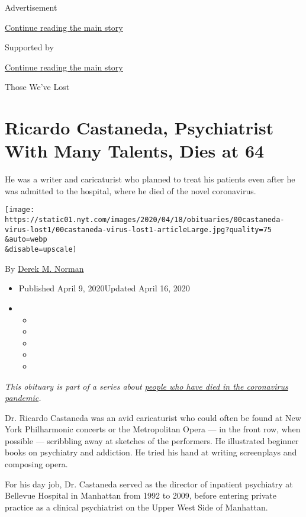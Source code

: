 Advertisement

\protect\hyperlink{after-top}{Continue reading the main story}

Supported by

\protect\hyperlink{after-sponsor}{Continue reading the main story}

Those We've Lost

\hypertarget{ricardo-castaneda-psychiatrist-with-many-talents-dies-at-64}{%
\section{Ricardo Castaneda, Psychiatrist With Many Talents, Dies at
64}\label{ricardo-castaneda-psychiatrist-with-many-talents-dies-at-64}}

He was a writer and caricaturist who planned to treat his patients even
after he was admitted to the hospital, where he died of the novel
coronavirus.

\texttt{[image: https://static01.nyt.com/images/2020/04/18/obituaries/00castaneda-virus-lost1/00castaneda-virus-lost1-articleLarge.jpg?quality=75\\\&auto=webp\\\&disable=upscale]}

By \href{https://www.nytimes.com/by/derek-m-norman}{Derek M. Norman}

\begin{itemize}
\item
  Published April 9, 2020Updated April 16, 2020
\item
  \begin{itemize}
  \item
  \item
  \item
  \item
  \item
  \end{itemize}
\end{itemize}

\emph{This obituary is part of a series about}
\href{https://www.nytimes.com/series/people-who-have-died-of-the-coronavirus}{\emph{people
who have died in the coronavirus pandemic}}\emph{.}

Dr. Ricardo Castaneda was an avid caricaturist who could often be found
at New York Philharmonic concerts or the Metropolitan Opera --- in the
front row, when possible --- scribbling away at sketches of the
performers. He illustrated beginner books on psychiatry and addiction.
He tried his hand at writing screenplays and composing opera.

For his day job, Dr. Castaneda served as the director of inpatient
psychiatry at Bellevue Hospital in Manhattan from 1992 to 2009, before
entering private practice as a clinical psychiatrist on the Upper West
Side of Manhattan.


